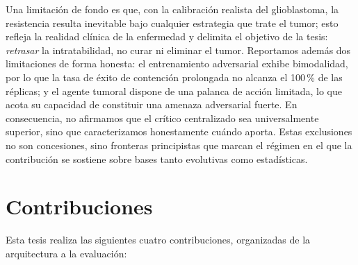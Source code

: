 Una limitación de fondo es que, con la calibración realista del glioblastoma, la resistencia resulta inevitable bajo cualquier estrategia que trate el tumor; esto refleja la realidad clínica de la enfermedad y delimita el objetivo de la tesis: \emph{retrasar} la intratabilidad, no curar ni eliminar el tumor. Reportamos además dos limitaciones de forma honesta: el entrenamiento adversarial exhibe bimodalidad, por lo que la tasa de éxito de contención prolongada no alcanza el 100\,\% de las réplicas; y el agente tumoral dispone de una palanca de acción limitada, lo que acota su capacidad de constituir una amenaza adversarial fuerte. En consecuencia, no afirmamos que el crítico centralizado sea universalmente superior, sino que caracterizamos honestamente cuándo aporta. Estas exclusiones no son concesiones, sino fronteras principistas que marcan el régimen en el que la contribución se sostiene sobre bases tanto evolutivas como estadísticas.

\section{Contribuciones}
\label{sec:contribuciones}

Esta tesis realiza las siguientes cuatro contribuciones, organizadas de la arquitectura a la evaluación:

